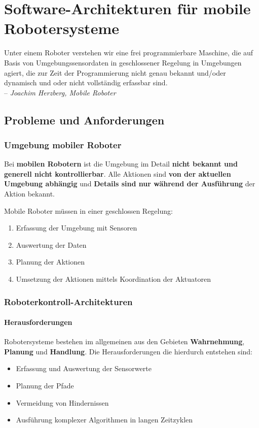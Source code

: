 
\chapter{Software-Architekturen für mobile Robotersysteme}
\begin{displayquote}
	Unter einem Roboter verstehen wir eine frei programmierbare Maschine, die auf
	Basis von Umgebungssensordaten in geschlossener Regelung in Umgebungen
	agiert, die zur Zeit der Programmierung nicht genau bekannt und/oder
	dynamisch und oder nicht vollständig erfassbar sind. \\
	-- \textit{Joachim Herzberg, Mobile Roboter}
\end{displayquote}

\section{Probleme und Anforderungen}
\subsection{Umgebung mobiler Roboter}
Bei \textbf{mobilen Robotern} ist die Umgebung im Detail \textbf{nicht bekannt
und generell nicht kontrollierbar}. Alle Aktionen sind \textbf{von der aktuellen
Umgebung abhängig} und \textbf{Details sind nur während der Ausführung} der
Aktion bekannt.

Mobile Roboter müssen in einer geschlossen Regelung:
\begin{enumerate}
	\item Erfassung der Umgebung mit Sensoren
	\item Auswertung der Daten
	\item Planung der Aktionen
	\item Umsetzung der Aktionen mittels Koordination der Aktuatoren
\end{enumerate}

\subsection{Roboterkontroll-Architekturen}
\subsubsection{Herausforderungen}
Robotersysteme bestehen im allgemeinen aus den Gebieten \textbf{Wahrnehmung},
\textbf{Planung} und \textbf{Handlung}. Die Herausforderungen die hierdurch
entstehen sind:
\begin{itemize}
	\item Erfassung und Auswertung der Sensorwerte
	\item Planung der Pfade
	\item Vermeidung von Hindernissen
	\item Ausführung komplexer Algorithmen in langen Zeitzyklen
\end{itemize}

